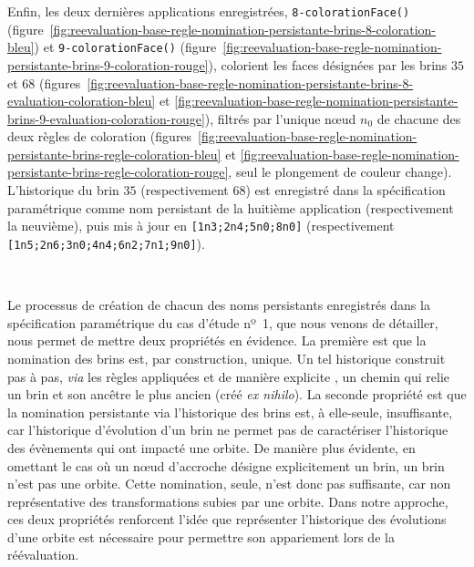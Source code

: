 Enfin, les deux dernières applications enregistrées,
\texttt{8-\allowbreak{}coloration\-Face()}
(figure~\ref{fig:reevaluation-base-regle-nomination-persistante-brins-8-coloration-bleu})
et
\texttt{9-\allowbreak{}coloration\-Face()}
(figure~\ref{fig:reevaluation-base-regle-nomination-persistante-brins-9-coloration-rouge}),
colorient les faces désignées par les brins \(35\) et \(68\)
(figures~\ref{fig:reevaluation-base-regle-nomination-persistante-brins-8-evaluation-coloration-bleu}
et
\ref{fig:reevaluation-base-regle-nomination-persistante-brins-9-evaluation-coloration-rouge}),
filtrés par l'unique n\oe ud \(n_{0}\) de chacune des deux règles de coloration
(figures~\ref{fig:reevaluation-base-regle-nomination-persistante-brins-regle-coloration-bleu}
et
\ref{fig:reevaluation-base-regle-nomination-persistante-brins-regle-coloration-rouge},
seul le plongement de couleur change). %
L'historique du brin \(35\) (respectivement \(68\)) est enregistré dans la
spécification paramétrique comme nom persistant de la huitième application
(respectivement la neuvième), puis mis à jour en
\texttt{[1n3;\allowbreak{}2n4;\allowbreak{}5n0;\allowbreak{}8n0]} (respectivement
\texttt{[1n5;\allowbreak{}2n6;\allowbreak{}3n0;\allowbreak{}4n4;\allowbreak{}6n2;\allowbreak{}7n1;\allowbreak{}9n0]}). %

~

Le processus de création de chacun des noms persistants enregistrés dans la
spécification paramétrique du cas d'étude nº~1, que nous venons de détailler,
nous permet de mettre deux propriétés en évidence. %
La première est que la nomination des brins est, par construction, unique. %
Un tel historique construit pas à pas, \textit{via} les règles appliquées et de
manière explicite %
, un chemin qui relie un brin et son ancêtre le plus ancien (créé
\textit{ex nihilo}). %
La seconde propriété est que la nomination persistante via l'historique des brins est, à elle-seule,
insuffisante, car l'historique d'évolution d'un brin ne permet pas de
caractériser l'historique des évènements qui ont impacté une orbite. %
De manière plus évidente, en omettant le cas où un n\oe ud d'accroche désigne
explicitement un brin, un brin n'est pas une orbite. %
Cette nomination, seule, n'est donc pas suffisante, car non représentative des
transformations subies par une orbite. %
Dans notre approche, ces deux propriétés renforcent l'idée que représenter
l'historique des évolutions d'une orbite est nécessaire pour permettre son
appariement lors de la réévaluation. %


